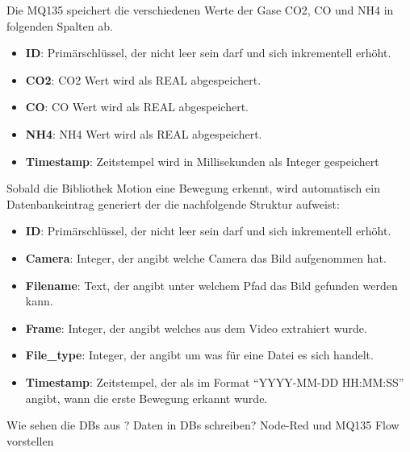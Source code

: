 Die MQ135 speichert die verschiedenen Werte der Gase CO2, CO und NH4 in folgenden Spalten ab.
\begin{itemize}
	\item \textbf{ID}: Primärschlüssel, der nicht leer sein darf und sich inkrementell erhöht.  
	\item \textbf{CO2}: CO2 Wert wird als REAL abgespeichert.
	\item \textbf{CO}: CO Wert wird als REAL abgespeichert.
	\item \textbf{NH4}: NH4 Wert wird als REAL abgespeichert. 
	\item \textbf{Timestamp}: Zeitstempel wird in Millisekunden als Integer gespeichert
\end{itemize}

Sobald die Bibliothek Motion eine Bewegung erkennt, wird automatisch ein Datenbankeintrag generiert der die nachfolgende Struktur aufweist:
\begin{itemize}
	\item \textbf{ID}: Primärschlüssel, der nicht leer sein darf und sich inkrementell erhöht.  
	\item \textbf{Camera}: Integer, der angibt welche Camera das Bild aufgenommen hat.
	\item \textbf{Filename}: Text, der angibt unter welchem Pfad das Bild gefunden werden kann.
	\item \textbf{Frame}: Integer, der angibt welches aus dem Video extrahiert wurde. 
	\item \textbf{File\_type}: Integer, der angibt um was für eine Datei es sich handelt.
	\item \textbf{Timestamp}: Zeitstempel, der als im Format \enquote{YYYY-MM-DD HH:MM:SS} angibt, wann die erste Bewegung erkannt wurde.	
\end{itemize}


Wie sehen die DBs aus ?
Daten in DBs schreiben? Node-Red und MQ135
Flow vorstellen


